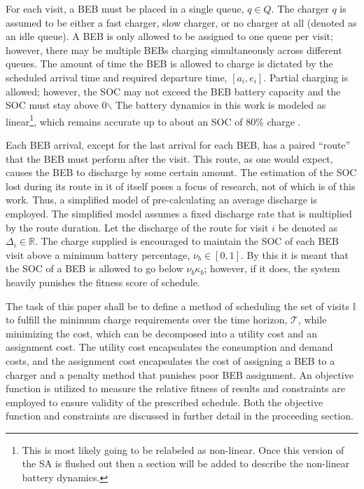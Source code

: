 \documentclass[11pt,a4paper,final]{article}
\newcommand{\T}{\mathcal{T}}                %
\newcommand{\I}{\mathbb{I}}                 %
\newcommand{\Qset}{Q}                       %
\begin{document}
For each visit, a BEB must be placed in a single queue, \(q \in \Qset\). The charger \(q\) is assumed to be either a fast
charger, slow charger, or no charger at all (denoted as an idle queue). A BEB is only allowed to be assigned to one
queue per visit; however, there may be multiple BEBs charging simultaneously across different queues. The amount of time
the BEB is allowed to charge is dictated by the scheduled arrival time and required departure time, \([a_i, e_i]\).
Partial charging is allowed; however, the SOC may not exceed the BEB battery capacity and the SOC must stay above 0$\backslash$%
The battery dynamics in this work is modeled as linear\footnote{This is most likely going to be relabeled as non-linear. Once this version of the SA is flushed out then a
section will be added to describe the non-linear battery dynamics.}, which remains accurate up to about an SOC of 80\% charge
\cite{li-2016-batter-elect}.

Each BEB arrival, except for the last arrival for each BEB, has a paired ``route'' that the BEB must perform after the
visit. This route, as one would expect, causes the BEB to discharge by some certain amount. The estimation of the SOC
lost during its route in it of itself poses a focus of research, not of which is of this work. Thus, a simplified model
of pre-calculating an average discharge is employed. The simplified model assumes a fixed discharge rate that is
multiplied by the route duration. Let the discharge of the route for visit \(i\) be denoted as \(\Delta_i \in \mathbb{R}\). The charge
supplied is encouraged to maintain the SOC of each BEB visit above a minimum battery percentage, \(\nu_b \in [0, 1]\). By this
it is meant that the SOC of a BEB is allowed to go below \(\nu_b\kappa_b\); however, if it does, the system heavily punishes the
fitness score of schedule.

The task of this paper shall be to define a method of scheduling the set of visits \(\I\) to fulfill the minimum charge
requirements over the time horizon, \(\T\), while minimizing the cost, which can be decomposed into a utility cost and an
assignment cost. The utility cost encapsulates the consumption and demand costs, and the assignment cost encapsulates
the cost of assigning a BEB to a charger and a penalty method that punishes poor BEB assignment. An objective function
is utilized to measure the relative fitness of results and constraints are employed to ensure validity of the prescribed
schedule. Both the objective function and constraints are discussed in further detail in the proceeding section.
\end{document}
